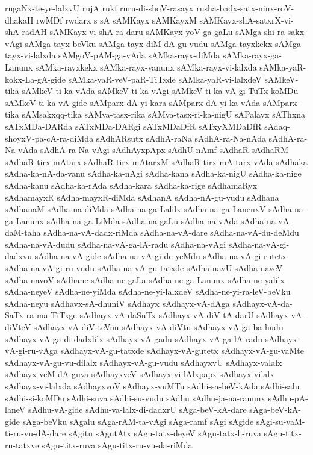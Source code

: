 {rugaNx-te-ye-lalxvU
rujA
rukf
ruru-di-shoV-rasayx
rusha-badx-satx-ninx-roV-dhakaH
rwMDf
rwdarx
s
sA
sAMKayx
sAMKayxM
sAMKayx-shA-satxrX-vi-shA-radAH
sAMKayx-vi-shA-ra-daru
sAMKayx-yoV-ga-gaLu
sAMga-shi-ra-sakx-vAgi
sAMga-tayx-beVku
sAMga-tayx-diM-dA-gu-vudu
sAMga-tayxkekx
sAMga-tayx-vi-lalxda
sAMgoV-pAM-ga-vAda
sAMka-rayx-diMda
sAMka-rayx-ga-Lanunx
sAMka-rayxkekx
sAMka-rayx-vanunx
sAMka-rayx-vi-lalxda
sAMka-yaR-kokx-La-gA-gide
sAMka-yaR-veV-paR-TiTxde
sAMka-yaR-vi-lalxdeV
sAMkeV-tika
sAMkeV-ti-ka-vAda
sAMkeV-ti-ka-vAgi
sAMkeV-ti-ka-vA-gi-TuTx-koMDu
sAMkeV-ti-ka-vA-gide
sAMparx-dA-yi-kara
sAMparx-dA-yi-ka-vAda
sAMparx-tika
sAMsakxqq-tika
sAMva-tasx-rika
sAMva-tasx-ri-ka-nigU
sAPalayx
sAThxna
sATxMDa-DARda
sATxMDa-DARgi
sATxMDaDfR
sATxyXMDaDfR
sAdaq-shoyxV-pa-cA-ra-diMda
sAdhARsutx
sAdhA-raNa
sAdhA-ra-Na-nAda
sAdhA-ra-Na-vAda
sAdhA-ra-Na-vAgi
sAdhAyxpApx
sAdhU-nAmf
sAdhaR
sAdhaRM
sAdhaR-tirx-mAtarx
sAdhaR-tirx-mAtarxM
sAdhaR-tirx-mA-tarx-vAda
sAdhaka
sAdha-ka-nA-da-vanu
sAdha-ka-nAgi
sAdha-kana
sAdha-ka-nigU
sAdha-ka-nige
sAdha-kanu
sAdha-ka-rAda
sAdha-kara
sAdha-ka-rige
sAdhamaRyx
sAdhamayxR
sAdha-mayxR-diMda
sAdhanA
sAdha-nA-gu-vudu
sAdhana
sAdhanaM
sAdha-na-diMda
sAdha-na-ga-Lalilx
sAdha-na-ga-LanenxV
sAdha-na-ga-Lanunx
sAdha-na-ga-LiMda
sAdha-na-gaLu
sAdha-na-vAda
sAdha-na-vA-daM-taha
sAdha-na-vA-dadx-riMda
sAdha-na-vA-dare
sAdha-na-vA-du-deMdu
sAdha-na-vA-dudu
sAdha-na-vA-ga-lA-radu
sAdha-na-vAgi
sAdha-na-vA-gi-dadxvu
sAdha-na-vA-gide
sAdha-na-vA-gi-de-yeMdu
sAdha-na-vA-gi-rutetx
sAdha-na-vA-gi-ru-vudu
sAdha-na-vA-gu-tatxde
sAdha-navU
sAdha-naveV
sAdha-navoV
sAdhane
sAdha-ne-gaLa
sAdha-ne-ga-Lanunx
sAdha-ne-yalilx
sAdha-neyeV
sAdha-ne-yiMda
sAdha-ne-yi-lalxdeV
sAdha-ne-yi-ra-leV-beVku
sAdha-neyu
sAdhavx-sA-dhuniV
sAdhayx
sAdhayx-vA-dAga
sAdhayx-vA-da-SaTx-ra-ma-TiTxge
sAdhayx-vA-daSuTx
sAdhayx-vA-diV-tA-darU
sAdhayx-vA-diVteV
sAdhayx-vA-diV-teVnu
sAdhayx-vA-diVtu
sAdhayx-vA-ga-ba-hudu
sAdhayx-vA-ga-di-dadxlilx
sAdhayx-vA-gadu
sAdhayx-vA-ga-lA-radu
sAdhayx-vA-gi-ru-vAga
sAdhayx-vA-gu-tatxde
sAdhayx-vA-gutetx
sAdhayx-vA-gu-vaMte
sAdhayx-vA-gu-vu-dilalx
sAdhayx-vA-gu-vudu
sAdhayxvU
sAdhayx-valalx
sAdhayx-veM-dA-guva
sAdhayxveV
sAdhayx-vi-lAlxpapx
sAdhayx-vilalx
sAdhayx-vi-lalxda
sAdhayxvoV
sAdhayx-vuMTu
sAdhi-sa-beV-kAda
sAdhi-salu
sAdhi-si-koMDu
sAdhi-suva
sAdhi-su-vudu
sAdhu
sAdhu-ja-na-ranunx
sAdhu-pA-laneV
sAdhu-vA-gide
sAdhu-va-lalx-di-dadxrU
sAga-beV-kA-dare
sAga-beV-kA-gide
sAga-beVku
sAgalu
sAga-rAM-ta-vAgi
sAga-ramf
sAgi
sAgide
sAgi-su-vaM-ti-ru-vu-dA-dare
sAgitu
sAgutAtx
sAgu-tatx-deyeV
sAgu-tatx-li-ruva
sAgu-titx-ru-tatxve
sAgu-titx-ruva
sAgu-titx-ru-vu-da-riMda
}
